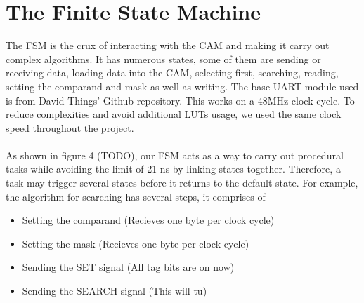 \section{The Finite State Machine}
The FSM is the crux of interacting with the CAM and making it carry out complex algorithms. 
It has numerous states, some of them are sending or receiving data, loading data into the CAM, selecting first, searching, reading, setting the comparand and mask as well as writing. 
The base UART module used is from David Things' Github repository. \cite{uart} This works on a 48MHz clock cycle.
To reduce complexities and avoid additional LUTs usage, we used the same clock speed throughout the project. 
\\\\
As shown in figure 4 (TODO), our FSM acts as a way to carry out procedural tasks while avoiding the limit of 21 ns by linking states together. 
Therefore, a task may trigger several states before it returns to the default state. 
For example, the algorithm for searching has several steps, it comprises of
\begin{itemize}
    \item Setting the comparand (Recieves one byte per clock cycle)
    \item Setting the mask (Recieves one byte per clock cycle)
    \item Sending the SET signal (All tag bits are on now)
    \item Sending the SEARCH signal (This will tu)
\end{itemize}